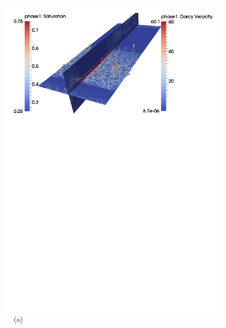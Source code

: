 \begin{figure}[ht] 
\vbox{
\hbox{\hspace{0.5cm}
\includegraphics[width=1.0\textwidth]{./Pics1/3D_Channel/3D_channel_darcy_vel_planes_30_1.pdf} 
}
\vspace{-12.0cm}
\hbox{\hspace{6.0cm} (a)     
}
\hbox{\hspace{0.5cm}
}}
\end{figure}
